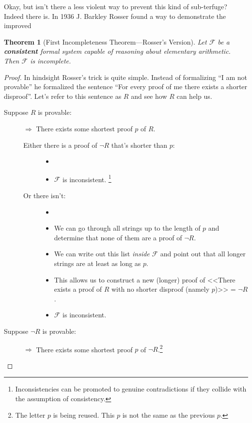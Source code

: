 \documentclass{article}
\newtheorem{theorem}{Theorem}
\newcommand{\F}{\ensuremath{\mathcal{F}}}
\begin{document}
Okay, but isn't there a less violent way to prevent this kind of sub-terfuge? Indeed there is. In 1936 J. Barkley Rosser found a way to demonstrate the improved

\begin{theorem}[First Incompleteness Theorem---Rosser's Version]
Let $\F$ be a \textbf{consistent} formal system capable of reasoning about elementary arithmetic. Then $\F$ is incomplete.
\end{theorem}

\begin{proof}
In hindsight Rosser's trick is quite simple. Instead of formalizing ``I am not provable'' he formalized the sentence ``For every proof of me there exists a shorter disproof''. Let's refer to this sentence as $R$ and see how $R$ can help us.
\begin{description}
\item[Suppose $R$ is provable:]
$\Rightarrow$ There exists some shortest proof $p$ of $R$.
\begin{description}
\item[Either there is a proof of $\neg R$ that's shorter than $p$:]
\begin{itemize}
\item[]
\item $\F$ is inconsistent. \lightning\footnote{Inconsistencies can be promoted to genuine contradictions if they collide with the assumption of consistency.}
\end{itemize}
\item[Or there isn't:]
\begin{itemize}
\item[]
\item We can go through all strings up to the length of $p$ and determine that none of them are a proof of $\neg R$.
\item We can write out this list \textit{inside} $\F$ and point out that all longer strings are at least as long as $p$.
\item This allows us to construct a new (longer) proof of <<There exists a proof of $R$ with no shorter disproof (namely $p$)>> = $\neg R$.
\item $\F$ is inconsistent. \lightning
\end{itemize}
\end{description}
\item[Suppose $\neg R$ is provable:]
$\Rightarrow$ There exists some shortest proof $p$ of $\neg R$.\footnote{The letter $p$ is being reused. This $p$ is not the same as the previous $p$.}

\end{description}
\end{proof}
\end{document}
